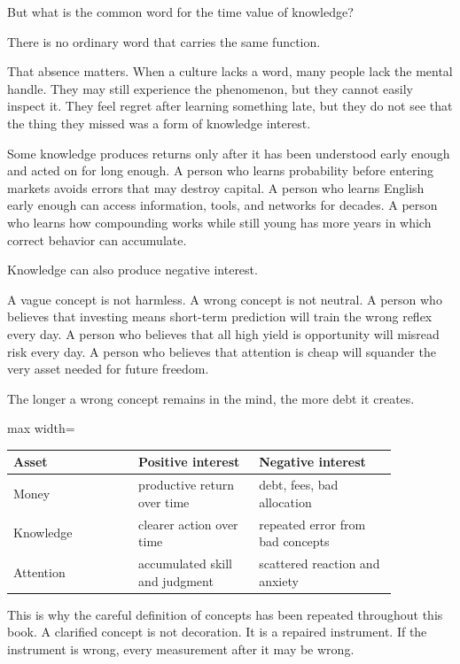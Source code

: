 But what is the common word for the time value of knowledge?

There is no ordinary word that carries the same function.

That absence matters. When a culture lacks a word, many people lack the mental handle. They may still experience the phenomenon, but they cannot easily inspect it. They feel regret after learning something late, but they do not see that the thing they missed was a form of knowledge interest.

Some knowledge produces returns only after it has been understood early enough and acted on for long enough. A person who learns probability before entering markets avoids errors that may destroy capital. A person who learns English early enough can access information, tools, and networks for decades. A person who learns how compounding works while still young has more years in which correct behavior can accumulate.

Knowledge can also produce negative interest.

A vague concept is not harmless. A wrong concept is not neutral. A person who believes that investing means short-term prediction will train the wrong reflex every day. A person who believes that all high yield is opportunity will misread risk every day. A person who believes that attention is cheap will squander the very asset needed for future freedom.

The longer a wrong concept remains in the mind, the more debt it creates.

\begin{center}
\begin{adjustbox}{max width=\linewidth}
\begin{tabular}{p{0.28\linewidth}p{0.27\linewidth}p{0.31\linewidth}}
\hline
Asset & Positive interest & Negative interest \\
\hline
Money & productive return over time & debt, fees, bad allocation \\
Knowledge & clearer action over time & repeated error from bad concepts \\
Attention & accumulated skill and judgment & scattered reaction and anxiety \\
\hline
\end{tabular}
\end{adjustbox}
\end{center}

This is why the careful definition of concepts has been repeated throughout this book. A clarified concept is not decoration. It is a repaired instrument. If the instrument is wrong, every measurement after it may be wrong.

